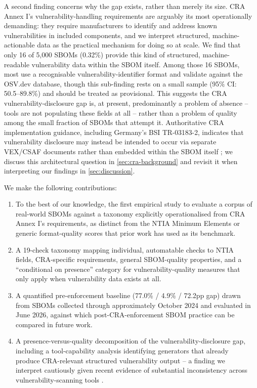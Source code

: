 \documentclass[11pt]{article}
\begin{document}
A second finding concerns why the gap exists, rather than merely its size. CRA Annex I's vulnerability-handling requirements are arguably its most operationally demanding: they require manufacturers to identify and address known vulnerabilities in included components, and we interpret structured, machine-actionable data as the practical mechanism for doing so at scale. We find that only 16 of 5,000 SBOMs (0.32\%) provide this kind of structured, machine-readable vulnerability data within the SBOM itself. Among those 16 SBOMs, most use a recognisable vulnerability-identifier format and validate against the OSV.dev database, though this sub-finding rests on a small sample (95\% CI: 50.5--89.8\%) and should be treated as provisional. This suggests the CRA vulnerability-disclosure gap is, at present, predominantly a problem of absence -- tools are not populating these fields at all -- rather than a problem of quality among the small fraction of SBOMs that attempt it. Authoritative CRA implementation guidance, including Germany's BSI TR-03183-2, indicates that vulnerability disclosure may instead be intended to occur via separate VEX/CSAF documents rather than embedded within the SBOM itself \cite{bsi2025}; we discuss this architectural question in \cref{sec:cra-background} and revisit it when interpreting our findings in \cref{sec:discussion}.

We make the following contributions:

\begin{enumerate}
\item To the best of our knowledge, the first empirical study to evaluate a corpus of real-world SBOMs against a taxonomy explicitly operationalised from CRA Annex I's requirements, as distinct from the NTIA Minimum Elements or generic format-quality scores that prior work has used as its benchmark.
\item A 19-check taxonomy mapping individual, automatable checks to NTIA fields, CRA-specific requirements, general SBOM-quality properties, and a ``conditional on presence'' category for vulnerability-quality measures that only apply when vulnerability data exists at all.
\item A quantified pre-enforcement baseline (77.0\% / 4.9\% / 72.2pp gap) drawn from SBOMs collected through approximately October 2024 and evaluated in June 2026, against which post-CRA-enforcement SBOM practice can be compared in future work.
\item A presence-versus-quality decomposition of the vulnerability-disclosure gap, including a tool-capability analysis identifying generators that already produce CRA-relevant structured vulnerability output -- a finding we interpret cautiously given recent evidence of substantial inconsistency across vulnerability-scanning tools \cite{churakova2025}.
\end{enumerate}
\end{document}
